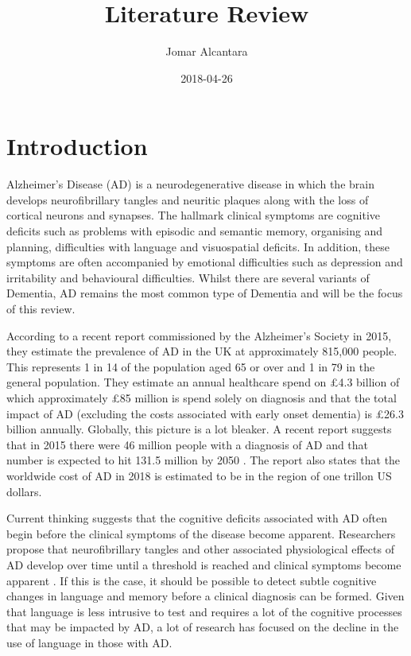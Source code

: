 \documentclass[a4paper]{article}
\title{Literature Review}
\date{2018-04-26}
\author{Jomar Alcantara}
\begin{document}
\maketitle
\newpage
\tableofcontents
\newpage
\section{Introduction}
\par
Alzheimer's Disease (AD) is a neurodegenerative disease in which the brain develops neurofibrillary tangles and neuritic plaques along with the loss of cortical neurons and synapses. The hallmark clinical symptoms are cognitive deficits such as problems with episodic and semantic memory, organising and planning, difficulties with language and visuospatial deficits\cite{AmericanPsychiatricAssociation2013}. In addition, these symptoms are often accompanied by emotional difficulties such as depression and irritability and behavioural difficulties. Whilst there are several variants of Dementia, AD remains the most common type of Dementia and will be the focus of this review. \newline
\par
According to a recent report commissioned by the Alzheimer's Society in 2015, they estimate the prevalence of AD in the UK at approximately 815,000 people. This represents 1 in 14 of the population aged 65 or over and 1 in 79 in the general population. They estimate an annual healthcare spend on £4.3 billion of which approximately £85 million is spend solely on diagnosis and that the total impact of AD (excluding the costs associated with early onset dementia) is £26.3 billion annually. Globally, this picture is a lot bleaker. A recent report suggests that in 2015 there were 46 million people with a diagnosis of AD and that number is expected to hit 131.5 million by 2050 \cite{Prince2015}. The report also states that the worldwide cost of AD in 2018 is estimated to be in the region of one trillon US dollars. \newline
\par
Current thinking suggests that the cognitive deficits associated with AD often begin before the clinical symptoms of the disease become apparent. Researchers propose that neurofibrillary tangles and other associated physiological effects of AD develop over time until a threshold is reached and clinical symptoms become apparent \cite{Nestor2006}. If this is the case, it should be possible to detect subtle cognitive changes in language and memory before a clinical diagnosis can be formed. Given that language is less intrusive to test and requires a lot of the cognitive processes that may be impacted by AD, a lot of research has focused on the decline in the use of language in those with AD.  \newline
\end{document}
